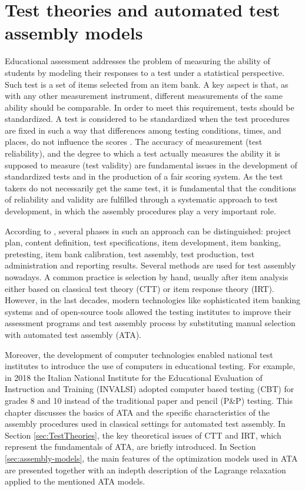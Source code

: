 \chapter{Test theories and automated test assembly models}
\label{ch:ATA}

Educational assessment addresses the problem of measuring the ability of students by modeling their responses to a test under a statistical perspective. Such test is a set of items selected from an item bank. A key aspect is that, as with any other measurement instrument, different measurements of the same ability should be comparable. In order to meet this requirement, tests should be standardized. A test is considered to be standardized when the test procedures are fixed in such a way that differences among testing conditions, times, and places, do not influence the scores \parencite{verschoor2007genetic}. The accuracy of measurement (test reliability), and the degree to which a test actually measures the ability it is supposed to measure (test validity) are fundamental issues in the development of standardized tests and in the production of a fair scoring system. As the test takers do not necessarily get the same test, it is fundamental that the conditions of reliability and validity are fulfilled through a systematic approach to test development, in which the assembly procedures play a very important role.

According to \textcite{downing2006twelve}, several phases in such an approach can be distinguished: project plan, content definition, test specifications, item development, item banking, pretesting, item bank calibration, test assembly, test production, test administration and reporting results. Several methods are used for test assembly nowadays. A common practice is selection by hand, usually after item analysis either based on classical test theory (CTT) or item response theory (IRT). However, in the last decades, modern technologies like sophisticated item banking systems and of open-source tools allowed the testing institutes to improve their assessment programs and test assembly process by substituting manual selection with automated test assembly (ATA). 

Moreover, the development of computer technologies enabled national test institutes to introduce the use of computers in educational testing. For example, in 2018 the Italian National Institute for the Educational Evaluation of Instruction and Training (INVALSI) adopted computer based testing (CBT) for grades 8 and 10 instead of the traditional paper and pencil (P\&P) testing. This chapter discusses the basics of ATA and the specific characteristics of the assembly procedures used in classical settings for automated test assembly. In Section \ref{sec:TestTheories}, the key theoretical issues of CTT and IRT, which represent the fundamentals of ATA, are briefly introduced. In Section \ref{sec:assembly-models}, the main features of the optimization models used in ATA are presented together with an indepth description of the Lagrange relaxation \parencite{fisher1981lagrangian} applied to the mentioned ATA models.




